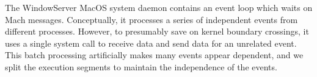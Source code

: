 The WindowServer MacOS system daemon contains an event loop which waits on
Mach messages. Conceptually, it processes a series of independent events from
different processes. However, to presumably save on kernel boundary crossings,
it uses a single system call to receive data and send data for an unrelated
event. This batch processing artificially makes many events appear dependent,
and we split the execution segments to maintain the independence of the events.

